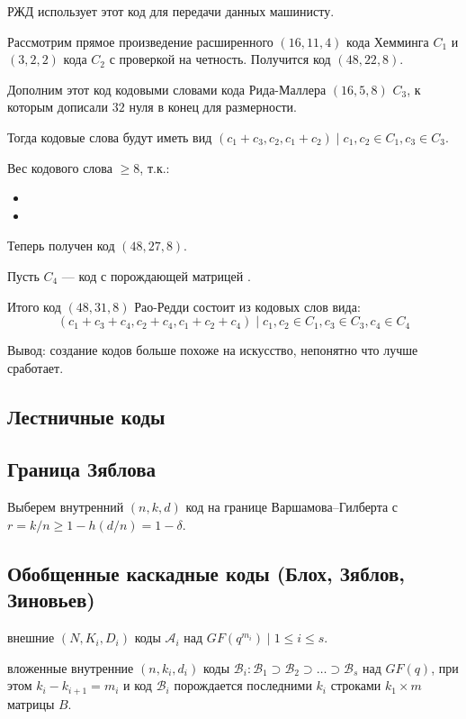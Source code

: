 РЖД использует этот код для передачи данных машинисту.

Рассмотрим прямое произведение расширенного \((16,11,4)\) кода Хемминга \(C_1\) и
\((3,2,2)\) кода \(C_2\) с проверкой на четность.
Получится код \((48,22,8)\).

Дополним этот код кодовыми словами кода Рида-Маллера \((16, 5, 8)\) \(C_3\),
к которым дописали \(32\) нуля в конец для размерности.

Тогда кодовые слова будут иметь вид \((c_1 + c_3, c_2, c_1 + c_2) \mid c_1, c_2 \in C_1, c_3 \in C_3\).

Вес кодового слова \( \geq 8\), т.к.:
\begin{itemize}
    \item \?
    \item \?
\end{itemize}

Теперь получен код \((48, 27, 8)\).

Пусть \(C_4\) --- код с порождающей матрицей \?.

Итого код \((48, 31, 8)\) Рао-Редди состоит из кодовых слов вида:
\[(c_1 + c_3 + c_4,c_2 + c_4,c_1 + c_2 + c_4) \mid c_1,c_2 \in C_1, c_3 \in C_3, c_4 \in C_4\]

Вывод: создание кодов больше похоже на искусство,
непонятно что лучше сработает.

\subsection{Лестничные коды}

\? %

\subsection{Граница Зяблова}

Выберем внутренний \((n,k,d)\) код на границе Варшамова--Гилберта
с \(r = k / n \geq 1 - h(d / n) = 1 - \delta\).

\?

\subsection{Обобщенные каскадные коды (Блох, Зяблов, Зиновьев)}

\? внешние \((N, K_i, D_i)\) коды \(\mathcal{A}_i\) над \(GF(q^{m_i}) \mid 1 \leq i \leq s\).

\? вложенные внутренние \((n, k_i, d_i)\) коды
\(\mathcal{B}_i : \mathcal{B}_1 \supset \mathcal{B}_2 \supset \dots \supset \mathcal{B}_s\) над \(GF(q)\), при этом \(k_i - k_{i+1} = m_i\) и код
\(\mathcal{B}_i\) порождается последними \(k_i\) строками \(k_1 \times m\) матрицы \(B\).

